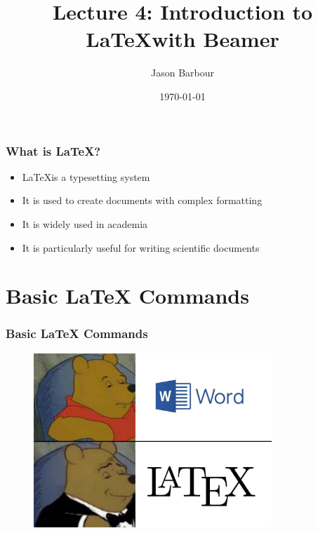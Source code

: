 \documentclass{beamer}
\title{Lecture 4: Introduction to \LaTeX with Beamer}
\author{Jason Barbour}
\date{\today}
\institute{American University of Beirut}
\begin{document}
\begin{frame}
    \maketitle
\end{frame}


\begin{frame}
    \frametitle{What is \LaTeX?}
    \begin{itemize}
        \item \LaTeX is a typesetting system
        \item It is used to create documents with complex formatting
        \item It is widely used in academia
        \item It is particularly useful for writing scientific documents
    \end{itemize}
\end{frame}

\section{Basic \LaTeX{} Commands}
\begin{frame}
    \frametitle{Basic \LaTeX{} Commands}
    \begin{figure}
        \centering
        \includegraphics[width=0.8\textwidth]{../Latex/Image.jpg}
    \end{figure}
\end{frame}
\end{document}

